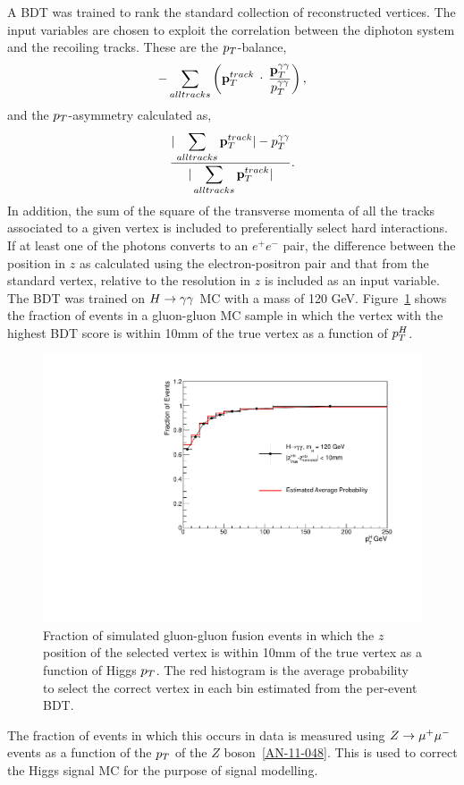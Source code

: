 A BDT was trained to rank the standard collection of reconstructed vertices.
The input variables are chosen to exploit the correlation between the diphoton system and the recoiling tracks.
These are the $p_{T}$-balance,
\begin{eqnarray}
	-\sum_{all tracks} \left(\ptvec^{track}\cdot \frac{\displaystyle \ptggvec}{\displaystyle \ptgg}\right), 
\end{eqnarray}
and the $p_{T}$-asymmetry calculated as,
\begin{eqnarray}
	\frac{\displaystyle |\sum_{all tracks} \mathbf{p}_{T}^{track}| - p_{T}^{\gamma\gamma} }{ \displaystyle|\sum_{all tracks} \mathbf{p}_{T}^{track}|}.
\end{eqnarray}
In addition, the sum of the square of the transverse momenta of all the tracks associated 
to a given vertex is included to preferentially select hard interactions. If at least one of the 
photons converts to an $e^{+}e^{-}$ pair, the difference between the position in $z$ as calculated 
using the electron-positron pair and that from the standard vertex, relative to the resolution in $z$
is included as an input variable. The BDT was trained on $H\rightarrow\gamma\gamma$ MC with a mass of 120 GeV. 
Figure~\ref{fig:vtxeffhmc} shows the fraction of events in a gluon-gluon MC sample in which 
the vertex with the highest BDT score is within 10mm of the true vertex as a function of $p_{T}^{H}$.
\begin{figure}
\includegraphics[width=.8\textwidth]{hgg7TeV/generalPlots/vtxEffHMC.pdf}
\caption{Fraction of simulated gluon-gluon fusion events in which the $z$ position of the selected vertex
is within 10mm of the true vertex as a function of Higgs $p_{T}$. The red histogram is the average 
probability to select the correct vertex in each bin estimated from the per-event BDT.}
\label{fig:vtxeffhmc}
\end{figure} 
The fraction of events in which this occurs in data is measured using $Z\rightarrow \mu^{+}\mu^{-}$ events
as a function of the $p_{T}$ of the $Z$ boson~\ref{AN-11-048}. This is used to correct the Higgs signal MC for 
the purpose of signal modelling. 

